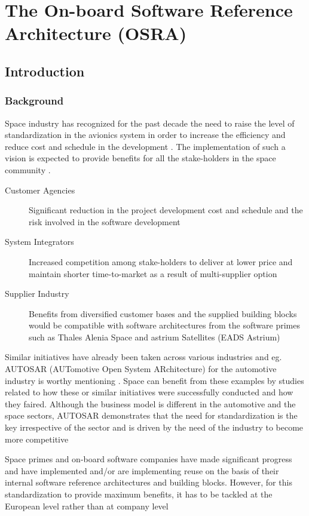 
\chapter{The On-board Software Reference Architecture (OSRA)}
\label{chap:OSRA}
\section{Introduction}
\subsection{Background}
Space industry has recognized for the past decade the need to raise the level of standardization in the avionics system in order to increase the efficiency and reduce cost and schedule in the development \cite{SAVOIR}.
The implementation of such a vision is expected to provide benefits for all the stake-holders in the space community \cite{SAVOIR}.

\begin{description}
\item  [Customer Agencies] Significant reduction in the project development cost and schedule and the risk involved in the software development
\item [System Integrators] Increased competition among stake-holders to deliver at lower price and maintain shorter time-to-market as a result of multi-supplier option
\item [Supplier Industry] Benefits from diversified customer bases and the supplied building blocks would be compatible with software architectures from the software primes such as Thales Alenia Space and astrium Satellites (EADS Astrium)
\end{description}

Similar initiatives have already been taken across various industries and eg. AUTOSAR (AUTomotive Open System ARchitecture) for the automotive industry is worthy mentioning \cite{BasConAUTOSAR}. Space can benefit from these examples by studies related to how these or similar initiatives were successfully conducted and how they faired. Although the business model is different in the automotive and the space sectors, AUTOSAR demonstrates that the need for standardization is the key irrespective of the sector and is driven by the need of the industry to become more competitive \cite{EfAnAUTOSAR}

Space primes and on-board software companies have made significant progress and have implemented and/or are implementing reuse on the basis of their internal software reference architectures and building blocks. However, for this standardization to provide maximum benefits, it has to be tackled at the European level rather than at company level \cite{SAVOIR}

